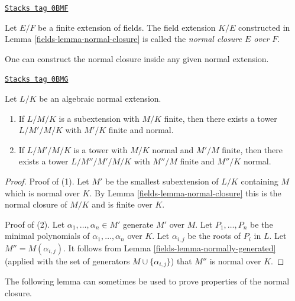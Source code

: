 \begin{definition}
\label{fields-definition-normal-closure}
\href{https://stacks.math.columbia.edu/tag/0BMF}{\texttt{Stacks tag 0BMF}}

Let $E/F$ be a finite extension of fields. The field extension $K/E$
constructed in Lemma \ref{fields-lemma-normal-closure}
is called the {\it normal closure $E$ over $F$}.
\end{definition}

One can construct the normal closure inside any given normal extension.

\begin{lemma}
\label{fields-lemma-normal-closure-inside-normal}
\href{https://stacks.math.columbia.edu/tag/0BMG}{\texttt{Stacks tag 0BMG}}

Let $L/K$ be an algebraic normal extension.
\begin{enumerate}
\item If $L/M/K$ is a subextension with $M/K$ finite, then there exists
a tower $L/M'/M/K$ with $M'/K$ finite and normal.
\item If $L/M'/M/K$ is a tower with $M/K$ normal and $M'/M$ finite,
then there exists a tower $L/M''/M'/M/K$ with $M''/M$
finite and $M''/K$ normal.
\end{enumerate}
\end{lemma}

\begin{proof}

Proof of (1). Let $M'$ be the smallest subextension of $L/K$ containing $M$
which is normal over $K$. By Lemma \ref{fields-lemma-normal-closure}
this is the normal closure of $M/K$ and is finite over $K$.

\medskip\noindent
Proof of (2). Let $\alpha_1, \ldots, \alpha_n \in M'$ generate $M'$ over $M$.
Let $P_1, \ldots, P_n$ be the minimal polynomials of
$\alpha_1, \ldots, \alpha_n$ over $K$. Let $\alpha_{i, j}$ be the roots
of $P_i$ in $L$. Let $M''  = M(\alpha_{i, j})$. It follows from
Lemma \ref{fields-lemma-normally-generated}
(applied with the set of generators $M \cup \{\alpha_{i, j}\}$)
that $M''$ is normal over $K$.
\end{proof}

The following lemma can sometimes be used to prove properties
of the normal closure.

